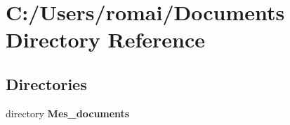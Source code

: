 \section{C\+:/\+Users/romai/\+Documents Directory Reference}
\label{dir_79a32c7230e840ed6023ae8d87b93b3a}
\subsection*{Directories}
\begin{DoxyCompactItemize}
\item 
directory \textbf{ Mes\+\_\+documents}
\end{DoxyCompactItemize}
